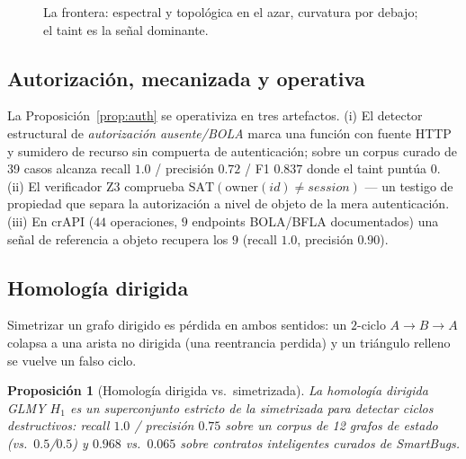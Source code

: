 \documentclass[journal]{IEEEtran}
\newtheorem{proposition}{Proposición}
\begin{document}
\begin{figure}[!t]
\centering
{}
\caption{La frontera: espectral y topológica en el azar, curvatura por debajo; el
taint es la señal dominante.}
\label{fig:boundary}
\end{figure}

\subsection{Autorización, mecanizada y operativa}
\label{sec:authz}
La Proposición~\ref{prop:auth} se operativiza en tres artefactos. (i) El detector
estructural de \emph{autorización ausente/BOLA} marca una función con fuente HTTP y
sumidero de recurso sin compuerta de autenticación; sobre un corpus curado de 39
casos alcanza recall $1.0$ / precisión $0.72$ / F1 $0.837$ donde el taint puntúa
$0$. (ii) El verificador Z3 \cite{z3} comprueba
$\mathrm{SAT}(\mathrm{owner}(id)\neq session)$ --- un testigo de propiedad que
separa la autorización a nivel de objeto de la mera autenticación. (iii) En crAPI
($44$ operaciones, $9$ endpoints BOLA/BFLA documentados) una señal de referencia a
objeto recupera los $9$ (recall $1.0$, precisión $0.90$).

\subsection{Homología dirigida}
\label{sec:glmy}
Simetrizar un grafo dirigido es pérdida en ambos sentidos: un $2$-ciclo
$A\to B\to A$ colapsa a una arista no dirigida (una reentrancia perdida) y un
triángulo relleno se vuelve un falso ciclo.

\begin{proposition}[Homología dirigida vs.\ simetrizada]
\label{prop:glmy}
La homología dirigida GLMY $H_1$ \cite{glmy2012} es un superconjunto estricto de la
simetrizada para detectar ciclos destructivos: recall $1.0$ / precisión $0.75$
sobre un corpus de 12 grafos de estado (vs.\ $0.5$/$0.5$) y $0.968$ vs.\ $0.065$
sobre contratos inteligentes curados de SmartBugs.
\end{proposition}
\end{document}
